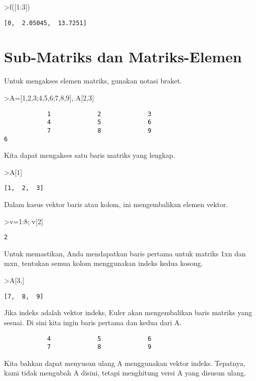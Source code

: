 \documentclass[
]{book}
\begin{document}
\textgreater f({[}1:3{]})

\begin{verbatim}
[0,  2.05045,  13.7251]
\end{verbatim}

\section{Sub-Matriks dan Matriks-Elemen}\label{sub-matriks-dan-matriks-elemen}

Untuk mengakses elemen matriks, gunakan notasi braket.

\textgreater A={[}1,2,3;4,5,6;7,8,9{]}, A{[}2,3{]}

\begin{verbatim}
            1             2             3 
            4             5             6 
            7             8             9 
6
\end{verbatim}

Kita dapat mengakses satu baris matriks yang lengkap.

\textgreater A{[}1{]}

\begin{verbatim}
[1,  2,  3]
\end{verbatim}

Dalam kasus vektor baris atau kolom, ini mengembalikan elemen vektor.

\textgreater v=1:8; v{[}2{]}

\begin{verbatim}
2
\end{verbatim}

Untuk memastikan, Anda mendapatkan baris pertama untuk matriks 1xn dan mxn, tentukan semua kolom menggunakan indeks kedua kosong.

\textgreater A{[}3,{]}

\begin{verbatim}
[7,  8,  9]
\end{verbatim}

Jika indeks adalah vektor indeks, Euler akan mengembalikan baris matriks yang sesuai. Di sini kita ingin baris pertama dan kedua dari A.

\begin{verbatim}
            4             5             6 
            7             8             9 
\end{verbatim}

Kita bahkan dapat menyusun ulang A menggunakan vektor indeks. Tepatnya, kami tidak mengubah A disini, tetapi menghitung versi A yang disusun ulang.
\end{document}
